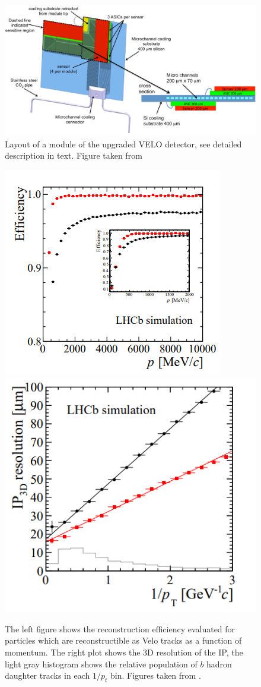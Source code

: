 \begin{figure}[!h]
\centering
\includegraphics[width=\linewidth]{figures/Velo_upgraded_module.pdf}
\caption{Layout of a module of the upgraded VELO detector, see detailed description in text. Figure taken from \cite{velo_upgrade_tdr}
\label{fig:veloUpgradeModule}}
\end{figure}




\begin{figure}[!h]
 \begin{center}
  \includegraphics[width=0.49\linewidth]{figures/Velo_upgrade_tracking.PNG}
   \includegraphics[width=0.49\linewidth]{figures/Velo_upgrade_IP.PNG}
    \caption{The left figure shows the reconstruction efficiency evaluated for particles which are reconstructible as Velo tracks as a function of momentum. The right plot shows the  3D resolution of the IP, the light gray histogram shows the relative population of $b$ hadron daughter tracks in each $1/p_t$ bin. Figures taken from \cite{velo_upgrade_tdr}.}%
    \label{fig:upgrade_velo_performance}%
 \end{center}
\end{figure}

